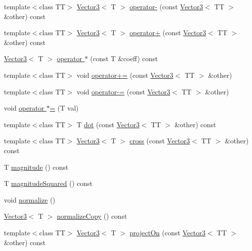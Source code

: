 \begin{CompactItemize}
\item 
template$<$class TT$>$ \hyperlink{class_j_g_t_l_1_1_vector3}{Vector3}$<$ T $>$ \hyperlink{class_j_g_t_l_1_1_vector3_e5139f97e72fed6c594e2e233cbfb974}{operator-} (const \hyperlink{class_j_g_t_l_1_1_vector3}{Vector3}$<$ TT $>$ \&other) const 
\item 
template$<$class TT$>$ \hyperlink{class_j_g_t_l_1_1_vector3}{Vector3}$<$ T $>$ \hyperlink{class_j_g_t_l_1_1_vector3_5262b5c7212831d7a00b43c387d644f2}{operator+} (const \hyperlink{class_j_g_t_l_1_1_vector3}{Vector3}$<$ TT $>$ \&other) const 
\item 
\hyperlink{class_j_g_t_l_1_1_vector3}{Vector3}$<$ T $>$ \hyperlink{class_j_g_t_l_1_1_vector3_0ea35cf6fa072615683d4ad70ecad938}{operator $\ast$} (const T \&coeff) const 
\item 
template$<$class TT$>$ void \hyperlink{class_j_g_t_l_1_1_vector3_3673291ef3d210d322d9ade1ba95d187}{operator+=} (const \hyperlink{class_j_g_t_l_1_1_vector3}{Vector3}$<$ TT $>$ \&other)
\item 
template$<$class TT$>$ void \hyperlink{class_j_g_t_l_1_1_vector3_a1a1507a82937de0c6978326c48f65aa}{operator-=} (const \hyperlink{class_j_g_t_l_1_1_vector3}{Vector3}$<$ TT $>$ \&other)
\item 
void \hyperlink{class_j_g_t_l_1_1_vector3_a8e375b5e3a512bde0dfe8337cf42cee}{operator $\ast$=} (T val)
\item 
template$<$class TT$>$ T \hyperlink{class_j_g_t_l_1_1_vector3_36b583fceb4142714a498d16667d9442}{dot} (const \hyperlink{class_j_g_t_l_1_1_vector3}{Vector3}$<$ TT $>$ \&other) const 
\item 
template$<$class TT$>$ \hyperlink{class_j_g_t_l_1_1_vector3}{Vector3}$<$ T $>$ \hyperlink{class_j_g_t_l_1_1_vector3_b2df31c04e7fb4fad13154e2c9034755}{cross} (const \hyperlink{class_j_g_t_l_1_1_vector3}{Vector3}$<$ TT $>$ \&other) const 
\item 
T \hyperlink{class_j_g_t_l_1_1_vector3_76b6c8216c59e895f9e1360cb0deea67}{magnitude} () const
\item 
T \hyperlink{class_j_g_t_l_1_1_vector3_642599e9f0c714fa746cf583fff34297}{magnitude\-Squared} () const
\item 
void \hyperlink{class_j_g_t_l_1_1_vector3_9d567b7f1c468d29f1d310e2e8febd99}{normalize} ()
\item 
\hyperlink{class_j_g_t_l_1_1_vector3}{Vector3}$<$ T $>$ \hyperlink{class_j_g_t_l_1_1_vector3_11253802e62f75a42e95c4dc93404e9d}{normalize\-Copy} () const
\item 
template$<$class TT$>$ \hyperlink{class_j_g_t_l_1_1_vector3}{Vector3}$<$ T $>$ \hyperlink{class_j_g_t_l_1_1_vector3_5393d864b2849e116b2a990d31ccbb9c}{project\-On} (const \hyperlink{class_j_g_t_l_1_1_vector3}{Vector3}$<$ TT $>$ \&other) const 

\end{CompactItemize}
